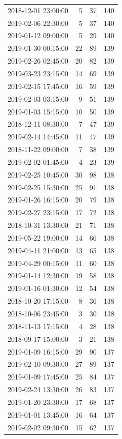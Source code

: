 \begin{tabular}{lrrr}
2018-12-01 23:00:00 & 5 & 37 & 140 \\
2019-02-06 22:30:00 & 5 & 37 & 140 \\
2019-01-12 09:00:00 & 5 & 29 & 140 \\
2019-01-30 00:15:00 & 22 & 89 & 139 \\
2019-02-26 02:45:00 & 20 & 82 & 139 \\
2019-03-23 23:15:00 & 14 & 69 & 139 \\
2019-02-15 17:45:00 & 16 & 59 & 139 \\
2019-02-03 03:15:00 & 9 & 51 & 139 \\
2019-01-03 15:15:00 & 10 & 50 & 139 \\
2018-12-11 08:30:00 & 7 & 47 & 139 \\
2019-02-14 14:45:00 & 11 & 47 & 139 \\
2018-11-22 09:00:00 & 7 & 38 & 139 \\
2019-02-02 01:45:00 & 4 & 23 & 139 \\
2019-02-25 10:45:00 & 30 & 98 & 138 \\
2019-02-25 15:30:00 & 25 & 91 & 138 \\
2019-01-26 16:15:00 & 20 & 79 & 138 \\
2019-02-27 23:15:00 & 17 & 72 & 138 \\
2018-10-31 13:30:00 & 21 & 71 & 138 \\
2019-05-22 19:00:00 & 14 & 66 & 138 \\
2019-04-11 21:00:00 & 13 & 65 & 138 \\
2019-04-29 00:15:00 & 11 & 60 & 138 \\
2019-01-14 12:30:00 & 19 & 58 & 138 \\
2019-01-16 01:30:00 & 12 & 54 & 138 \\
2018-10-20 17:15:00 & 8 & 36 & 138 \\
2018-10-06 23:45:00 & 3 & 30 & 138 \\
2018-11-13 17:15:00 & 4 & 28 & 138 \\
2018-09-17 15:00:00 & 3 & 21 & 138 \\
2019-01-09 16:15:00 & 29 & 90 & 137 \\
2019-02-10 09:30:00 & 27 & 89 & 137 \\
2019-01-09 17:45:00 & 25 & 84 & 137 \\
2019-02-24 13:30:00 & 26 & 83 & 137 \\
2019-01-20 23:30:00 & 17 & 68 & 137 \\
2019-01-01 13:45:00 & 16 & 64 & 137 \\
2019-02-02 09:30:00 & 15 & 62 & 137 \\

\end{tabular}
